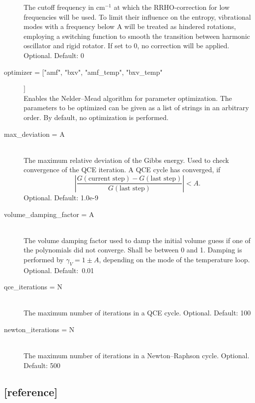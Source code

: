 \documentclass{scrartcl}
\begin{document}
\begin{description}
        The cutoff frequency in cm$^{-1}$ at which the RRHO-correction for low frequencies will be used.
        To limit their influence on the entropy, vibrational modes with a frequency below A will be treated as 
        hindered rotations, employing a switching function to smooth the transition between harmonic oscillator 
        and rigid rotator. If set to 0, no correction will be applied.
        Optional. Default: 0
    \item[optimizer = ["amf", "bxv", "amf\_temp", "bxv\_temp"]] \hfill \\
        Enables the Nelder--Mead algorithm for parameter optimization.
        The parameters to be optimized can be given as a list of strings in an arbitrary order.
        By default, no optimization is performed.
    \item[max\_deviation = A] \hfill \\
        The maximum relative deviation of the Gibbs energy.
        Used to check convergence of the QCE iteration.
        A QCE cycle has converged, if \[\left|\frac{G(\text{current step}) - G(\text{last step})}{G(\text{last step})}\right| < A.\]
        Optional. Default: 1.0e-9
        \vspace{0.1cm}
    \item[volume\_damping\_factor = A] \hfill \\
        The volume damping factor used to damp the initial volume guess if one of the polynomials did not converge.
        Shall be between 0 and 1.
        Damping is performed by $\gamma_V = 1 \pm A$, depending on the mode of the temperature loop.
        Optional. Default:~0.01
        \vspace{0.1cm}
    \item[qce\_iterations = N] \hfill \\
        The maximum number of iterations in a QCE cycle.
        Optional. Default: 100
        \vspace{0.1cm}
    \item[newton\_iterations = N] \hfill \\
        The maximum number of iterations in a Newton--Raphson cycle.
        Optional. Default: 500
\end{description}

\subsection*{[reference]}
\vspace{-0.3cm}
\end{document}
